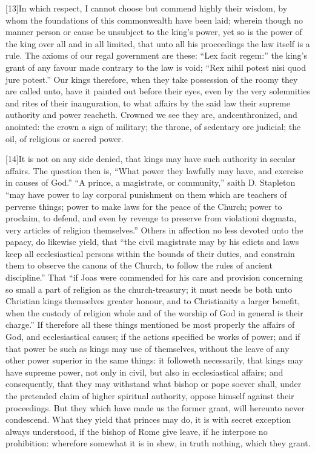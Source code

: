 [13]In which respect, I cannot choose but commend highly their wisdom, by whom the foundations of this commonwealth have been laid; wherein though no manner person or cause be unsubject to the king’s power, yet so is the power of the king over all and in all limited, that unto all his proceedings the law itself is a rule. The axioms of our regal government are these: “Lex facit regem:” the king’s grant of any favour made contrary to the law is void; “Rex nihil potest nisi quod jure potest.” Our kings therefore, when they take possession of the roomy they are called unto, have it painted out before their eyes, even by the very solemnities and rites of their inauguration, to what affairs by the said law their supreme authority and power reacheth. Crowned we see they are, andcenthronized, and anointed: the crown a sign of military; the throne, of sedentary ore judicial; the oil, of religious or sacred power.

[14]It is not on any side denied, that kings may have such authority in secular affairs. The question then is, “What power they lawfully may have, and exercise in causes of God.” “A prince, a magistrate, or community,” saith D. Stapleton “may have power to lay corporal punishment on them which are teachers of perverse things; power to make laws for the peace of the Church; power to proclaim, to defend, and even by revenge to preserve from violationi dogmata, very articles of religion themselves.” Others in affection no less devoted unto the papacy, do likewise yield, that “the civil magistrate may by his edicts and laws keep all ecclesiastical persons within the bounds of their duties, and constrain them to observe the canons of the Church, to follow the rules of ancient discipline.” That “if Joas were commended for his care and provision concerning so small a part of religion as the church-treasury; it must needs be both unto Christian kings themselves greater honour, and to Christianity a larger benefit, when the custody of religion whole and of the worship of God in general is their charge.” If therefore all these things mentioned be most properly the affairs of God, and ecclesiastical causes; if the actions specified be works of power; and if that power be such as kings may use of themselves, without the leave of any other power superior in the same things: it followeth necessarily, that kings may have supreme power, not only in civil, but also in ecclesiastical affairs; and consequently, that they may withstand what bishop or pope soever shall, under the pretended claim of higher spiritual authority, oppose himself against their proceedings. But they which have made us the former grant, will hereunto never condescend. What they yield that princes may do, it is with secret exception always understood, if the bishop of Rome give leave, if he interpose no prohibition: wherefore somewhat it is in shew, in truth nothing, which they grant.

